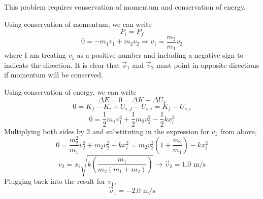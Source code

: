 \documentclass[11pt,letterpaper]{article}
\newcommand{\sol}[1]{{\color{NavyBlue} #1}}
\begin{document}
\sol{This problem requires conservation of momentum and conservation of energy. 

Using conservation of momentum, we can write
$$P_i = P_f$$
$$0 = -m_1v_1 + m_2v_2 \Rightarrow v_1 = \frac{m_2}{m_1}v_2$$
where I am treating $v_1$ as a positive number and including a negative sign to indicate the direction. It is clear that $\vec{v}_1$ and $\vec{v}_2$ must point in opposite directions if momentum will be conserved.

Using conservation of energy, we can write
$$\Delta E = 0 = \Delta K + \Delta U_s$$
$$0 = K_f-K_i + U_{s,f}-U_{s,i} = K_f - U_{s,i}$$
$$0 = \frac{1}{2}m_1v_1^2 + \frac{1}{2}m_2v_2^2 - \frac{1}{2}kx_i^2$$ 
Multiplying both sides by 2 and substituting in the expression for $v_1$ from above,
$$0 = \frac{m_2^2}{m_1}v_2^2+m_2v_2^2 - kx_i^2 = m_2v_2^2\left(1+\frac{m_2}{m_1}\right) - kx_i^2$$
$$ v_2 = x_i\sqrt{k\left(\frac{m_1}{m_2(m_1+m_2)}\right)} \rightarrow \boxed{\vec{v}_2=1.0\mbox{ m/s}}$$
Plugging back into the result for $v_1$,
$$\boxed{\vec{v}_1=-2.0\mbox{ m/s}}$$

}
\end{document}
